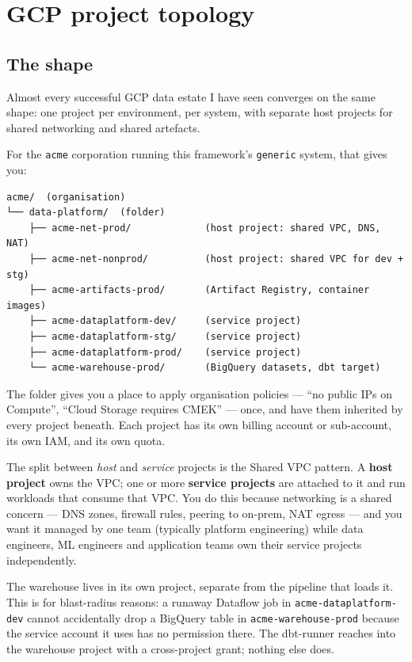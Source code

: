 \documentclass[
  11pt,
  british,
  oneside]{book}
\begin{document}
\hypertarget{gcp-project-topology}{%
\section{GCP project topology}\label{gcp-project-topology}}

\hypertarget{the-shape}{%
\subsection{The shape}\label{the-shape}}

Almost every successful GCP data estate I have seen converges on the
same shape: one project per environment, per system, with separate host
projects for shared networking and shared artefacts.

For the \texttt{acme} corporation running this framework's
\texttt{generic} system, that gives you:

\begin{verbatim}
acme/  (organisation)
└── data-platform/  (folder)
    ├── acme-net-prod/             (host project: shared VPC, DNS, NAT)
    ├── acme-net-nonprod/          (host project: shared VPC for dev + stg)
    ├── acme-artifacts-prod/       (Artifact Registry, container images)
    ├── acme-dataplatform-dev/     (service project)
    ├── acme-dataplatform-stg/     (service project)
    ├── acme-dataplatform-prod/    (service project)
    └── acme-warehouse-prod/       (BigQuery datasets, dbt target)
\end{verbatim}

The folder gives you a place to apply organisation policies --- ``no
public IPs on Compute'', ``Cloud Storage requires CMEK'' --- once, and
have them inherited by every project beneath. Each project has its own
billing account or sub-account, its own IAM, and its own quota.

The split between \emph{host} and \emph{service} projects is the Shared
VPC pattern. A \textbf{host project} owns the VPC; one or
more \textbf{service projects} are attached to it and run workloads that
consume that VPC. You do this because networking is a shared concern ---
DNS zones, firewall rules, peering to on-prem, NAT egress --- and you
want it managed by one team (typically platform engineering) while data
engineers, ML engineers and application teams own their service projects
independently.

The warehouse lives in its own project, separate from the pipeline that
loads it. This is for blast-radius reasons: a runaway Dataflow job in
\texttt{acme-dataplatform-dev} cannot accidentally drop a BigQuery table
in \texttt{acme-warehouse-prod} because the service account it uses has
no permission there. The dbt-runner reaches into the warehouse project
with a cross-project grant; nothing else does.
\end{document}
